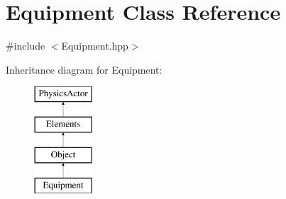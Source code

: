 \hypertarget{class_equipment}{\section{Equipment Class Reference}
\label{class_equipment}
}


{\ttfamily \#include $<$Equipment.\+hpp$>$}

Inheritance diagram for Equipment\+:\begin{figure}[H]
\begin{center}
\leavevmode
\includegraphics[height=4.000000cm]{class_equipment}
\end{center}
\end{figure}
